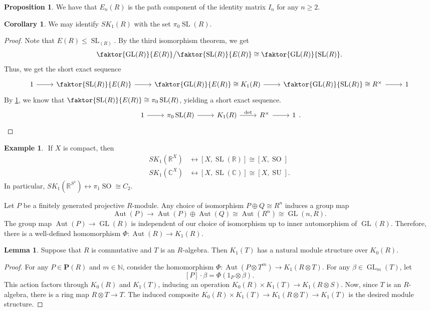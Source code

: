 \documentclass[10pt,letterpaper,cm]{nupset}
\theoremstyle{definition}
\newtheorem{exmp}[definition]{Example}
\theoremstyle{theorem}
\newtheorem{lemma}[definition]{Lemma}
\newtheorem{corollary}[definition]{Corollary}
\newtheorem{prop}[definition]{Proposition}
\theoremstyle{remark}
\newcommand{\C}{\mathbb C}
\newcommand{\N}{\mathbb N}
\renewcommand{\P}{\mathbf P}
\newcommand{\R}{\mathbb R}
\newcommand{\1}{\mathbf{1}}
\newcommand{\0}{\vec 0}
\DeclareMathOperator*{\GL}{GL}
\DeclareMathOperator*{\SL}{SL}
\DeclareMathOperator*{\SO}{SO}
\DeclareMathOperator*{\SU}{SU}
\DeclareMathOperator{\aut}{Aut}
\begin{document}
\begin{prop}\label{prev}
We have that $E_n(R)$ is the path component of the identity matrix $I_n$ for any $n\geq 2$.
\end{prop}

\begin{corollary}
We may identify $SK_1(R)$ with the set $\pi_0\SL(R)$. 
\end{corollary}
\begin{proof}
Note that $E(R)\leq \SL_(R)$. By the third isomorphism theorem, we get $$ \faktor{\GL(R)}{E(R)}\big / \faktor{\SL(R)}{E(R)} \cong \faktor{\GL(R)}{\SL(R)}.$$ Thus, we get the short exact sequence 
\[
\begin{tikzcd}
1 \arrow[r] & \faktor{\SL(R)}{E(R)} \arrow[r] & \faktor{\GL(R)}{E(R)}\cong K_1(R) \arrow[r] & \faktor{\GL(R)}{\SL(R)} \cong R^{\times} \arrow[r] & 1
\end{tikzcd}
\]
By \cref{prev}, we know that $\faktor{\SL(R)}{E(R)} \cong \pi_0\SL(R)$, yielding a short exact sequence.
\[
\begin{tikzcd}
1 \arrow[r] & \pi_0\SL(R) \arrow[r] & K_1(R) \arrow[r, "\det"] & R^{\times} \arrow[r] & 1
\end{tikzcd}.
\]
\end{proof}
\begin{exmp} $ $
If $X$ is compact, then 
\begin{align*}
SK_1(\R^X) &\leftrightarrow \left[X, \SL(\R)\right] \cong \left[X, \SO\right]
\\ SK_1(\C^X) &\leftrightarrow \left[X, \SL(\C)\right] \cong \left[X, \SU\right].
\end{align*}
In particular, $SK_1(\R^{S^1}) \leftrightarrow \pi_1 \SO \cong C_2$.
\end{exmp}

\smallskip


Let $P$ be a finitely generated projective $R$-module. Any choice of isomorphism $P \oplus Q \cong R^n$ induces a group map $$\aut(P) \to \aut(P) \oplus \aut(Q) \cong \aut(R^n) \cong \GL(n,R).$$ The group map $\aut(P) \to \GL(R)$ is independent of our choice of isomorphism up to inner automorphism of $\GL(R)$. Therefore, there is a well-defined homomorphism $\Phi: \aut(R) \to K_1(R)$.


\begin{lemma}
Suppose that $R$ is commutative and $T$ is an $R$-algebra. Then $K_1(T)$ has a natural module structure over $K_0(R)$.
\end{lemma}
\begin{proof}
For any $P \in \P(R)$ and $m\in \N$, consider the homomorphism $\Phi : \aut(P \otimes T^m) \to K_1(R\otimes T).$ For any $\beta \in \GL_m(T)$, let $$\left[P\right] \cdot \beta = \Phi(1_P \otimes \beta).$$This action factors through $K_0(R)$ and $K_1(T)$, inducing an operation $K_0(R) \times K_1(T) \to K_1(R \otimes S)$. Now, since $T$ is an $R$-algebra, there is a ring map $R\otimes T \to T$. The induced composite $K_0(R) \times K_1(T) \to K_1(R \otimes T) \to K_1(T)$ is the desired module structure.
\end{proof}
\end{document}
